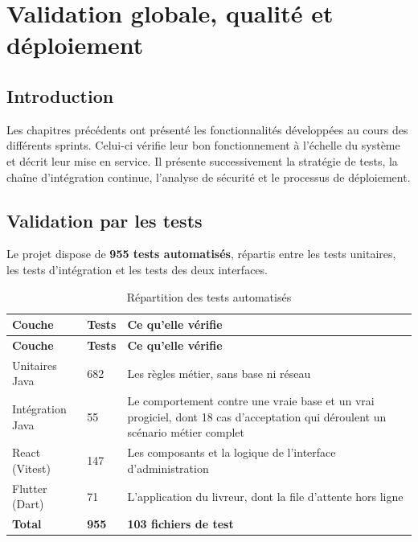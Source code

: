 %
\chapter{Validation globale, qualité et déploiement}
\label{ch:validation}

\section{Introduction}

Les chapitres précédents ont présenté les fonctionnalités développées au cours des différents
sprints. Celui-ci vérifie leur bon fonctionnement à l'échelle du système et décrit leur mise en
service. Il présente successivement la stratégie de tests, la chaîne d'intégration continue,
l'analyse de sécurité et le processus de déploiement.

\section{Validation par les tests}

Le projet dispose de \textbf{955 tests automatisés}, répartis entre les tests unitaires, les tests
d'intégration et les tests des deux interfaces.

\begin{small}
\begin{longtable}{L{4.6cm}C{1.8cm}L{6.6cm}}
\caption{Répartition des tests automatisés}\label{tab:tests-total}\\
\hline
{}
\textbf{Couche} & \textbf{Tests} & \textbf{Ce qu'elle vérifie} \\
\hline
\endfirsthead
\hline
{}
\textbf{Couche} & \textbf{Tests} & \textbf{Ce qu'elle vérifie} \\
\hline
\endhead
\hline
\endfoot
Unitaires Java & 682 & Les règles métier, sans base ni réseau \\
\hline
Intégration Java & 55 & Le comportement contre une vraie base et un vrai progiciel, dont 18 cas d'acceptation qui déroulent un scénario métier complet \\
\hline
React (Vitest) & 147 & Les composants et la logique de l'interface d'administration \\
\hline
Flutter (Dart) & 71 & L'application du livreur, dont la file d'attente hors ligne \\
\hline
{}
\textbf{Total} & \textbf{955} & \textbf{103 fichiers de test} \\
\hline
\end{longtable}
\end{small}

